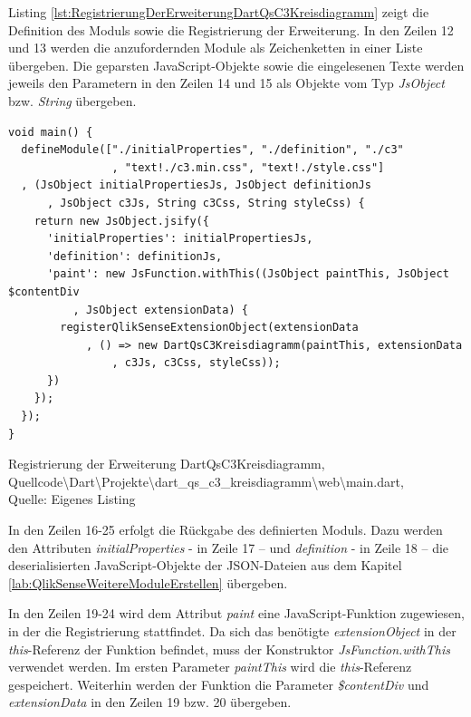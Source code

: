 Listing \ref{lst:RegistrierungDerErweiterungDartQsC3Kreisdiagramm} zeigt die Definition des Moduls sowie die Registrierung der Erweiterung. In den Zeilen 12 und 13 werden die anzufordernden Module als Zeichenketten in einer Liste übergeben. Die geparsten JavaScript-Objekte sowie die eingelesenen Texte werden jeweils den Parametern in den Zeilen 14 und 15 als Objekte vom Typ \textit{JsObject} bzw. \textit{String} übergeben.

\ifIncludeFigures\begin{listing}[htbp]
\begin{verbatim}
void main() {
  defineModule(["./initialProperties", "./definition", "./c3"
                , "text!./c3.min.css", "text!./style.css"]
  , (JsObject initialPropertiesJs, JsObject definitionJs
      , JsObject c3Js, String c3Css, String styleCss) {
    return new JsObject.jsify({
      'initialProperties': initialPropertiesJs,
      'definition': definitionJs,
      'paint': new JsFunction.withThis((JsObject paintThis, JsObject $contentDiv
          , JsObject extensionData) {
        registerQlikSenseExtensionObject(extensionData
            , () => new DartQsC3Kreisdiagramm(paintThis, extensionData
                , c3Js, c3Css, styleCss));
      })
    });
  });
}
\end{verbatim}
\caption[Registrierung der Erweiterung DartQsC3Kreisdiagramm]{Registrierung der Erweiterung DartQsC3Kreisdiagramm, \\Quellcode\textbackslash{}Dart\textbackslash{}Projekte\textbackslash{}dart\_qs\_c3\_kreisdiagramm\textbackslash{}web\textbackslash{}main.dart, \\Quelle: Eigenes Listing}
\label{lst:RegistrierungDerErweiterungDartQsC3Kreisdiagramm}
\end{listing}\fi

In den Zeilen 16-25 erfolgt die Rückgabe des definierten Moduls. Dazu werden den Attributen \textit{initialProperties} - in Zeile 17 – und \textit{definition} - in Zeile 18 – die deserialisierten JavaScript-Objekte der JSON-Dateien aus dem Kapitel \ref{lab:QlikSenseWeitereModuleErstellen} übergeben.

In den Zeilen 19-24 wird dem Attribut \textit{paint} eine JavaScript-Funktion zugewiesen, in der die Registrierung stattfindet. Da sich das benötigte \textit{extensionObject} in der \textit{this}-Referenz der Funktion befindet, muss der Konstruktor \textit{JsFunction.withThis} verwendet werden. Im ersten Parameter \textit{paintThis} wird die \textit{this}-Referenz gespeichert. Weiterhin werden der Funktion die Parameter \textit{\$contentDiv} und \textit{extensionData} in den Zeilen 19 bzw. 20 übergeben.

